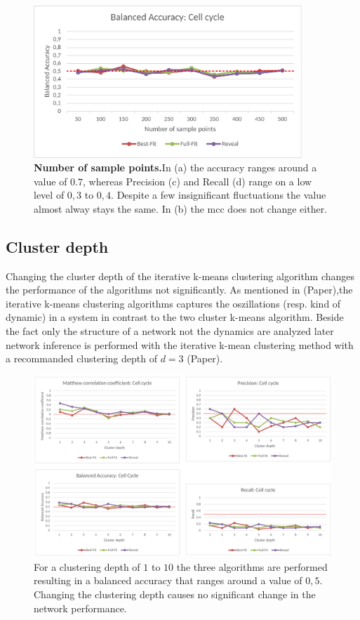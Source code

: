 \begin{figure}[H]
\centering\includegraphics[width=0.9\textwidth]{./Bilder/Scoring/insilico/2_cellcycle_measurements/Bacc.pdf}
\caption[NumberOfPoints]{\textbf{Number of sample points.}In (a) the accuracy ranges around a value of $0.7$, whereas Precision (c) and Recall (d) range on a low level of $0,3$ to $0,4$. Despite a few insignificant fluctuations the value almost alway stays the same. In (b) the mcc does not change either.}
\label{fig:}
\end{figure}

\subsection*{Cluster depth}
Changing the cluster depth of the iterative k-means clustering algorithm changes the performance of the algorithms not significantly. As mentioned in (Paper),the iterative k-means clustering algorithms captures the oszillations (resp. kind of dynamic) in a system in contrast to the two cluster k-means algorithm. Beside the fact only the structure of a network not the dynamics are analyzed later network inference is performed with the iterative k-mean clustering method with a recommanded clustering depth of $d=3$ (Paper).
\begin{figure}[H]
\centering\includegraphics[width=1.0\textwidth]{./Bilder/Scoring/insilico/3_cellcycle_clusterdepth/insilico3.pdf}
\caption[Clusterdepth BCC]{For a clustering depth of $1$ to $10$ the three algorithms are performed resulting in a balanced accuracy that ranges around a value of $0,5$. Changing the clustering depth causes no significant change in the network performance.}
\label{fig:7}
\end{figure}

